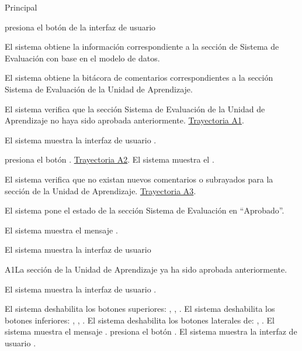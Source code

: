\begin{UCtrayectoria}{Principal}

    \UCpaso[\UCactor] presiona el botón   de la interfaz de usuario 

    \UCpaso El sistema obtiene la información correspondiente a la sección de Sistema de Evaluación con base en el modelo de datos.
    
    \UCpaso El sistema obtiene la bitácora de comentarios correspondientes a la sección Sistema de Evaluación de la Unidad de Aprendizaje. 
    
    \UCpaso El sistema verifica que la sección Sistema de Evaluación de la Unidad de Aprendizaje no haya sido aprobada anteriormente.  \hyperlink{SP2-CU9-A1}{Trayectoria A1}. 
    
    \UCpaso El sistema muestra la interfaz de usuario  . 
    
    \UCpaso[\UCactor] presiona el botón . \hyperlink{SP2-CU9-A2}{Trayectoria A2}.
    \UCpaso El sistema muestra el .
    
    \UCpaso	El sistema verifica que no existan nuevos comentarios o subrayados para la sección de la Unidad de Aprendizaje.  \hyperlink{SP2-CU9-A3}{Trayectoria A3}. 
    
    \UCpaso El sistema pone el estado de la sección Sistema de Evaluación en “Aprobado”.
    
    \UCpaso El sistema muestra el mensaje .

    \UCpaso El sistema muestra la interfaz de usuario 

\end{UCtrayectoria}


\begin{UCtrayectoriaA}{A1}{La sección de la Unidad de Aprendizaje ya ha sido aprobada anteriormente.}

	\hypertarget{SP2-CU9-A1}{\UCpaso El sistema muestra la interfaz de usuario .}
    \UCpaso El sistema deshabilita los botones superiores: , , .
    \UCpaso El sistema deshabilita los botones inferiores: , , .
    \UCpaso El sistema deshabilita los botones laterales de: , .
    \UCpaso El sistema muestra el mensaje .
    \UCpaso[\UCactor] presiona el botón .
    \UCpaso El sistema muestra la interfaz de usuario .
\end{UCtrayectoriaA}

